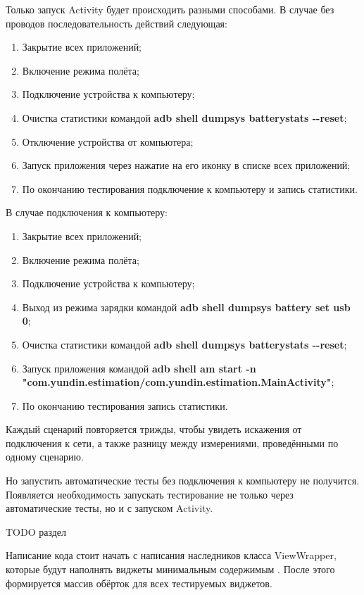 \documentclass[a4paper,14pt]{extarticle} %
\begin{document}
	Только запуск Activity будет происходить разными способами. В случае без проводов последовательность действий следующая:
	\begin{enumerate}
		\item Закрытие всех приложений;
		\item Включение режима полёта;
		\item Подключение устройства к компьютеру;
		\item Очистка статистики командой \textbf{adb shell dumpsys batterystats -{}-reset};
		\item Отключение устройства от компьютера;
		\item Запуск приложения через нажатие на его иконку в списке всех приложений;
		\item По окончанию тестирования подключение к компьютеру и запись статистики.
	\end{enumerate}

	В случае подключения к компьютеру:
	\begin{enumerate}
		\item Закрытие всех приложений;
		\item Включение режима полёта;
		\item Подключение устройства к компьютеру;
		\item Выход из режима зарядки командой \textbf{adb shell dumpsys battery set usb 0};
		\item Очистка статистики командой \textbf{adb shell dumpsys batterystats -{}-reset};
		\item Запуск приложения командой \textbf{adb shell am start -n "com.yundin.estimation/com.yundin.estimation.MainActivity"};
		\item По окончанию тестирования запись статистики.
	\end{enumerate}

	Каждый сценарий повторяется трижды, чтобы увидеть искажения от подключения к сети, а также разницу между измерениями, проведёнными по одному сценарию.
	
	Но запустить автоматические тесты без подключения к компьютеру не получится. Появляется необходимость запускать тестирование не только через автоматические тесты, но и с запуском Activity.
	
	{\huge TODO раздел}
	
	Написание кода стоит начать с написания наследников класса ViewWrapper, которые будут наполнять виджеты минимальным содержимым \ris{\ref{fig:wrapper}}. После этого формируется массив обёрток для всех тестируемых виджетов.
	
\end{document}
